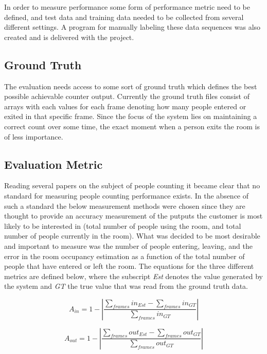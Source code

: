 In order to measure performance some form of performance metric need to be defined, and test data and training data needed to be collected from several different settings. A program for manually labeling these data sequences was also created and is delivered with the project.

\subsection{Ground Truth}
The evaluation needs access to some sort of ground truth which defines the best possible achievable counter output. Currently the ground truth files consist of arrays with each values for each frame denoting how many people entered or exited in that specific frame. Since the focus of the system lies on maintaining a correct count over some time, the exact moment when a person exits the room is of less importance.

\subsection{Evaluation Metric}
Reading several papers on the subject of people counting it became clear that no standard for measuring people counting performance exists. In the absence of such a standard the below measurement methods were chosen since they are thought to provide an accuracy measurement of the putputs the customer is most likely to be interested in (total number of people using the room, and total number of people currently in the room).
What was decided to be most desirable and important to measure was the number of people entering, leaving, and the error in the room occupancy estimation as a function of the total number of people that have entered or left the room. The equations for the three different metrics are defined below, where the subscript \textit{Est} denotes the value generated by the system and \textit{GT} the true value that was read from the ground truth data.

\begin{equation}
\label{eq:in_accuracy}
A_{in} = 1 - |\frac{\sum_{frames}{in_{Est}}-\sum_{frames}{in_{GT}}}{\sum_{frames}in_{GT}}|
\end{equation} 

\begin{equation}
\label{eq:out_accuracy}
A_{out} = 1 - |\frac{\sum_{frames}{out_{Est}}-\sum_{frames}out_{GT}}{\sum_{frames}out_{GT}}| 
\end{equation} 

